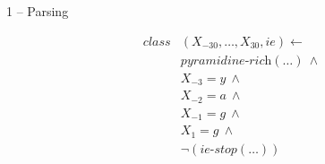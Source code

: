 \documentclass[presentation]{beamer}\mode<presentation>{\usetheme{AMSBolognaFC}}
\begin{document}
\begin{frame}{1 -- Parsing}
    
    \begin{minipage}{0.5\textwidth}
        \begin{equation*}
            \begin{split}
                class&(X_{-30}, \dots, X_{30}, ie) \leftarrow\\
                &\textit{pyramidine-rich}(\dots)\ \wedge\\
                &X_{-3} = y\ \wedge\\
                &X_{-2} = a\ \wedge\\
                &X_{-1} = g\ \wedge\\
                &X_{1} = g\ \wedge\\
                &\neg(\textit{ie-stop}(\dots)) 
            \end{split}
        \end{equation*}
    \end{minipage}
    \noindent\begin{minipage}{0.4\textwidth}%

\end{minipage}
\end{frame}
\end{document}
